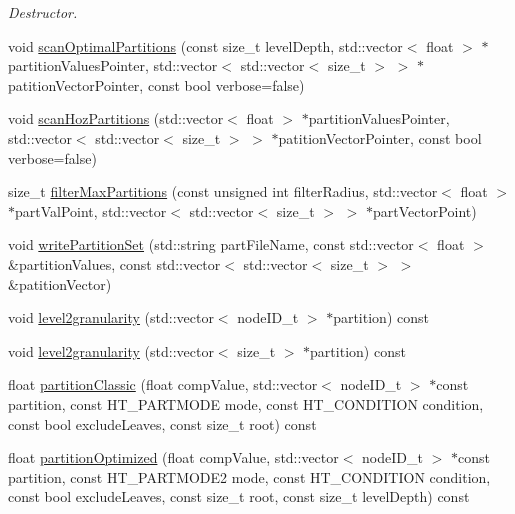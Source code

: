 \begin{DoxyCompactItemize}
\begin{DoxyCompactList}\small\item\em \-Destructor. \end{DoxyCompactList}\item 
void \hyperlink{classWHtreePartition_a41e4826046825e0b68058c280200f34b}{scan\-Optimal\-Partitions} (const size\-\_\-t level\-Depth, std\-::vector$<$ float $>$ $\ast$partition\-Values\-Pointer, std\-::vector$<$ std\-::vector$<$ size\-\_\-t $>$ $>$ $\ast$patition\-Vector\-Pointer, const bool verbose=false)
\item 
void \hyperlink{classWHtreePartition_afa47e3d1387084c43e835875749757a2}{scan\-Hoz\-Partitions} (std\-::vector$<$ float $>$ $\ast$partition\-Values\-Pointer, std\-::vector$<$ std\-::vector$<$ size\-\_\-t $>$ $>$ $\ast$patition\-Vector\-Pointer, const bool verbose=false)
\item 
size\-\_\-t \hyperlink{classWHtreePartition_a43ab6fca3a8e5bfec19590e79b4513cd}{filter\-Max\-Partitions} (const unsigned int filter\-Radius, std\-::vector$<$ float $>$ $\ast$part\-Val\-Point, std\-::vector$<$ std\-::vector$<$ size\-\_\-t $>$ $>$ $\ast$part\-Vector\-Point)
\item 
void \hyperlink{classWHtreePartition_a126a4d6ebcb8f55def510b0a0d8946a5}{write\-Partition\-Set} (std\-::string part\-File\-Name, const std\-::vector$<$ float $>$ \&partition\-Values, const std\-::vector$<$ std\-::vector$<$ size\-\_\-t $>$ $>$ \&patition\-Vector)
\item 
void \hyperlink{classWHtreePartition_ac6d7c1ee277fc5306653ae496936b8f5}{level2granularity} (std\-::vector$<$ node\-I\-D\-\_\-t $>$ $\ast$partition) const 
\item 
void \hyperlink{classWHtreePartition_ab504f8c4556354f0f0f2a853be1657fc}{level2granularity} (std\-::vector$<$ size\-\_\-t $>$ $\ast$partition) const 
\item 
float \hyperlink{classWHtreePartition_aace1381451e4ac85f8d0d082f8b9f52d}{partition\-Classic} (float comp\-Value, std\-::vector$<$ node\-I\-D\-\_\-t $>$ $\ast$const partition, const \-H\-T\-\_\-\-P\-A\-R\-T\-M\-O\-D\-E mode, const \-H\-T\-\_\-\-C\-O\-N\-D\-I\-T\-I\-O\-N condition, const bool exclude\-Leaves, const size\-\_\-t root) const 
\item 
float \hyperlink{classWHtreePartition_a7f779a38a2126adf454ffb8b0c993457}{partition\-Optimized} (float comp\-Value, std\-::vector$<$ node\-I\-D\-\_\-t $>$ $\ast$const partition, const \-H\-T\-\_\-\-P\-A\-R\-T\-M\-O\-D\-E2 mode, const \-H\-T\-\_\-\-C\-O\-N\-D\-I\-T\-I\-O\-N condition, const bool exclude\-Leaves, const size\-\_\-t root, const size\-\_\-t level\-Depth) const 

\end{DoxyCompactItemize}
